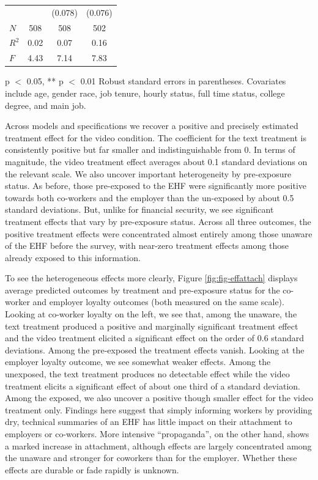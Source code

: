 \documentclass[
  11pt,
  oneside]{article}
\begin{document}
\begin{table}
\begin{threeparttable}
\begin{tabular}[t]{lccc}
\hspace{1em} &  & (0.078) & (0.076)\\
\hspace{1em}$N$ & 508 & 508 & 502\\
\hspace{1em}$R^2$ & 0.02 & 0.07 & 0.16\\
\hspace{1em}$F$ & 4.43 & 7.14 & 7.83\\
\bottomrule
\end{tabular}
\begin{tablenotes}
\item * p $<$ 0.05, ** p $<$ 0.01 Robust standard errors in parentheses. Covariates include age, gender race, job tenure, hourly status, full time status, college degree, and main job.
\end{tablenotes}
\end{threeparttable}
\end{table}

Across models and specifications we recover a positive and precisely estimated treatment effect for the video condition. The coefficient for the text treatment is consistently positive but far smaller and indistinguishable from 0. In terms of magnitude, the video treatment effect averages about 0.1 standard deviations on the relevant scale. We also uncover important heterogeneity by pre-exposure status. As before, those pre-exposed to the EHF were significantly more positive towards both co-workers and the employer than the un-exposed by about 0.5 standard deviations. But, unlike for financial security, we see significant treatment effects that vary by pre-exposure status. Across all three outcomes, the positive treatment effects were concentrated almost entirely among those unaware of the EHF before the survey, with near-zero treatment effects among those already exposed to this information.

To see the heterogeneous effects more clearly, Figure \ref{fig:fig-effattach} displays average predicted outcomes by treatment and pre-exposure status for the co-worker and employer loyalty outcomes (both measured on the same scale). Looking at co-worker loyalty on the left, we see that, among the unaware, the text treatment produced a positive and marginally significant treatment effect and the video treatment elicited a significant effect on the order of 0.6 standard deviations. Among the pre-exposed the treatment effects vanish. Looking at the employer loyalty outcome, we see somewhat weaker effects. Among the unexposed, the text treatment produces no detectable effect while the video treatment elicits a significant effect of about one third of a standard deviation. Among the exposed, we also uncover a positive though smaller effect for the video treatment only. Findings here suggest that simply informing workers by providing dry, technical summaries of an EHF has little impact on their attachment to employers or co-workers. More intensive ``propaganda'', on the other hand, shows a marked increase in attachment, although effects are largely concentrated among the unaware and stronger for coworkers than for the employer. Whether these effects are durable or fade rapidly is unknown.
\end{document}
